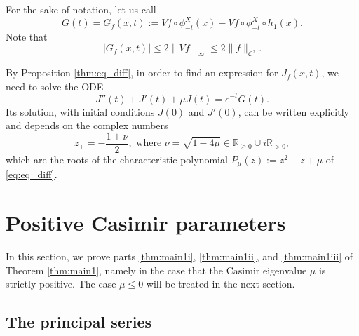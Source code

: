 \documentclass[JEP,XML,SOM,NoEqCountersInSection,Unicode,published]{cedram}
\newcommand \R{\mathbb{R}}
\theoremstyle{definition}
\begin{document}
For the sake of notation, let us call
\begin{equation*}
G(t) = G_f(x,t) := Vf \circ \phi^X_{-t}(x) - Vf \circ \phi^X_{-t} \circ h_1(x).
\end{equation*}
Note that
\begin{equation}\label{eq:estimate_G}
|G_f(x,t)|\leq 2 \|Vf\|_\infty \leq 2 \|f\|_{\mathscr{C}^2}.
\end{equation}

By Proposition \ref{thm:eq_diff}, in order to find an expression for $J_f(x,t)$, we need to solve the ODE
\begin{equation}\label{eq:eq_diff}
J''(t)+J'(t)+ \mu J(t) = e^{-t}G(t).
\end{equation}
Its solution, with initial conditions $J(0)$ and $J'(0)$, can be written explicitly and depends on the complex numbers
\[
z_{\pm} = -\frac{1\pm \nu}{2}, \text{\ \ \ where\ \ \ } \nu = \sqrt{1-4\mu} \in \R_{\geq 0} \cup i\R_{>0},
\]
which are the roots of the characteristic polynomial $P_\mu(z):= z^2 + z +\mu$ of \eqref{eq:eq_diff}.

\section{Positive Casimir parameters}\label{section:positive_param}

In this section, we prove parts \eqref{thm:main1i}, \eqref{thm:main1ii}, and \eqref{thm:main1iii} of Theorem \ref{thm:main1}, namely in the case that the Casimir eigenvalue $\mu$ is strictly positive. The case $\mu \leq 0$ will be treated in the next section.

\subsection{The principal series}\label{sec:princ}
\end{document}
